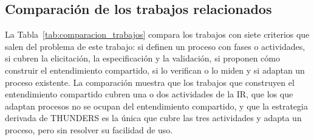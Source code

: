 \documentclass[12pt,letterpaper,oneside]{report}
\begin{document}
\subsection{Comparación de los trabajos relacionados}
La Tabla~\ref{tab:comparacion_trabajos} compara los trabajos con siete criterios
que salen del problema de este trabajo: si definen un proceso con fases o
actividades, si cubren la elicitación, la especificación y la validación, si proponen cómo construir el entendimiento compartido, si lo verifican o lo
miden y si adaptan un proceso existente. La
comparación muestra que los trabajos que construyen el entendimiento compartido
cubren una o dos actividades de la IR, que los que adaptan procesos no se ocupan
del entendimiento compartido, y que la estrategia derivada de THUNDERS es la
única que cubre las tres actividades y adapta un proceso, pero sin resolver su
facilidad de uso.
\end{document}
